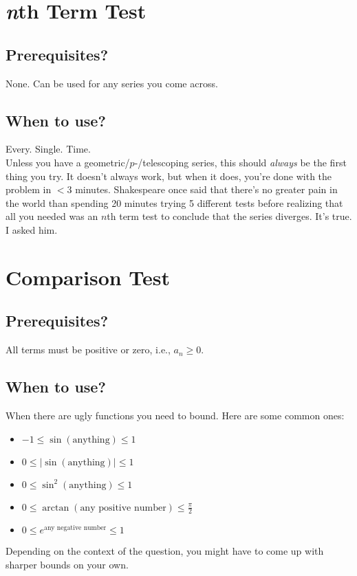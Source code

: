 \documentclass[11pt]{article}
\begin{document}
\section{\emph{n}th Term Test}

\subsection{Prerequisites?}

None. Can be used for any series you come across.

\subsection{When to use?}

Every. Single. Time.\\

\noindent Unless you have a geometric/$p$-/telescoping series, this should
\emph{always} be the first thing you try. It doesn't always work, but when it
does, you're done with the problem in $<3$ minutes. Shakespeare once said that
there's no greater pain in the world than spending 20 minutes trying 5 different
tests before realizing that all you needed was an $n$th term test to conclude
that the series diverges. It's true. I asked him.\\

\newpage
\section{Comparison Test}

\subsection{Prerequisites?}

All terms must be positive or zero, i.e., $a_n \geq 0$.

\subsection{When to use?}

When there are ugly functions you need to bound. Here are some common ones:
\begin{itemize}

  \item $-1 \leq \sin(\text{anything}) \leq 1$
  \item $0 \leq |\sin(\text{anything})| \leq 1$
  \item $0 \leq \sin^2(\text{anything}) \leq 1$
  \item $0 \leq \arctan(\text{any positive number}) \leq \displaystyle\frac\pi2$
  \item $0 \leq e^{\text{any negative number}} \leq 1$

\end{itemize}
Depending on the context of the question, you might have to come up with sharper
bounds on your own.
\end{document}
